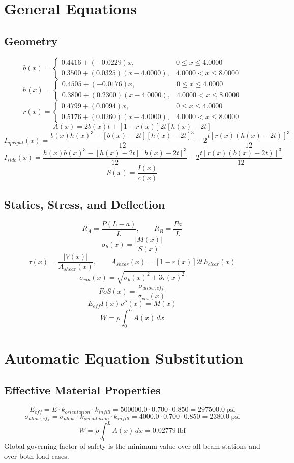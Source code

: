 \documentclass[11pt]{article}
\begin{document}
\section*{General Equations}
\subsection*{Geometry}
\[
b(x)=\begin{cases}0.4416 + (-0.0229)x, & 0 \le x \le 4.0000\\0.3500 + (0.0325)(x-4.0000), & 4.0000 < x \le 8.0000\end{cases}
\]
\[
h(x)=\begin{cases}0.4505 + (-0.0176)x, & 0 \le x \le 4.0000\\0.3800 + (0.2300)(x-4.0000), & 4.0000 < x \le 8.0000\end{cases}
\]
\[
r(x)=\begin{cases}0.4799 + (0.0094)x, & 0 \le x \le 4.0000\\0.5176 + (0.0260)(x-4.0000), & 4.0000 < x \le 8.0000\end{cases}
\]
\[
A(x)=2b(x)t+[1-r(x)]2t[h(x)-2t]
\]
\[
I_{upright}(x)=\frac{b(x)h(x)^3-[b(x)-2t][h(x)-2t]^3}{12}-2\frac{t[r(x)(h(x)-2t)]^3}{12}
\]
\[
I_{side}(x)=\frac{h(x)b(x)^3-[h(x)-2t][b(x)-2t]^3}{12}-2\frac{t[r(x)(b(x)-2t)]^3}{12}
\]
\[
S(x)=\frac{I(x)}{c(x)}
\]

\subsection*{Statics, Stress, and Deflection}
\[
R_A=\frac{P(L-a)}{L}, \qquad R_B=\frac{Pa}{L}
\]
\[
\sigma_b(x)=\frac{|M(x)|}{S(x)}
\]
\[
\tau(x)=\frac{|V(x)|}{A_{shear}(x)}, \qquad A_{shear}(x)=[1-r(x)]2t\,h_{clear}(x)
\]
\[
\sigma_{vm}(x)=\sqrt{\sigma_b(x)^2+3\tau(x)^2}
\]
\[
FoS(x)=\frac{\sigma_{allow,eff}}{\sigma_{vm}(x)}
\]
\[
E_{eff}I(x)v''(x)=M(x)
\]
\[
W=\rho\int_0^L A(x)\,dx
\]

\section*{Automatic Equation Substitution}
\subsection*{Effective Material Properties}
\[E_{eff} = E \cdot k_{orientation} \cdot k_{infill} = 500000.0 \cdot 0.700 \cdot 0.850 = 297500.0\ \mathrm{psi}\]
\[\sigma_{allow,eff} = \sigma_{allow} \cdot k_{orientation} \cdot k_{infill} = 4000.0 \cdot 0.700 \cdot 0.850 = 2380.0\ \mathrm{psi}\]
\[W = \rho \int_0^L A(x)\,dx = 0.02779\ \mathrm{lbf}\]
Global governing factor of safety is the minimum value over all beam stations and over both load cases.
\end{document}
